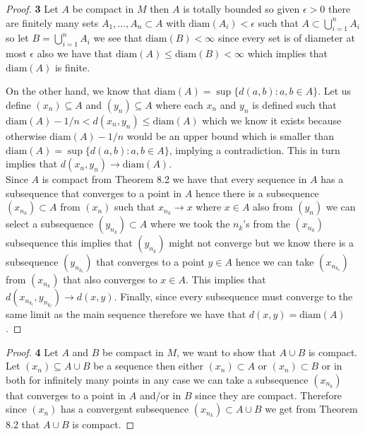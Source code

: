 \documentclass[11pt]{article}
\newcommand{\diam}{\text{diam}}
\theoremstyle{definition}
\begin{document}
\cleardoublepage
    \begin{proof}{\textbf{3}}
        Let $A$ be compact in $M$ then $A$ is totally bounded so given
        $\epsilon > 0$ there are finitely many sets $A_1,...,A_n \subset A$
        with $\diam(A_i) < \epsilon$ such that $A \subset \bigcup_{i=1}^{n} A_i$
        so let $B = \bigcup_{i=1}^{n} A_i$ we see
        that $\diam(B) < \infty$ since every set is of diameter at most
        $\epsilon$ also we have that $\diam(A) \leq \diam(B) < \infty$ which
        implies that $\diam(A)$ is finite.
        
        On the other hand, we know that $\diam(A) = \sup\{d(a,b): a,b \in A\}$.
        Let us define $(x_n) \subseteq A$ and $(y_n) \subseteq A$ where each
        $x_n$ and $y_n$ is defined such that 
        $\diam(A) - 1/n < d(x_n, y_n) \leq \diam(A)$ which we know it exists
        because otherwise $\diam(A) - 1/n$ would be an upper bound which is
        smaller than $\diam(A) = \sup\{d(a,b): a,b \in A\}$, implying a
        contradiction. This in turn implies that $d(x_n, y_n) \to \diam(A)$.\\
        Since $A$ is compact from Theorem 8.2 we have that every sequence in
        $A$ has a subsequence that converges to a point in $A$ hence there 
        is a subsequence $(x_{n_k}) \subset A$  from $(x_n)$ such that
        $x_{n_k} \to x$ where $x \in A$ also from $(y_n)$ we can select a
        subsequence $(y_{n_k}) \subset A$ where we took the $n_k$'s from the
        $(x_{n_k})$ subsequence this implies that $(y_{n_k})$ might not
        converge but we know there is a subsequence $(y_{n_{k_t}})$ that
        converges to a point $y \in A$ hence we can take $(x_{n_{k_t}})$
        from $(x_{n_k})$ that also converges to $x \in A$. This implies that 
        $d(x_{n_{k_t}}, y_{n_{k_t}}) \to d(x,y)$. Finally, since every
        subsequence must converge to the same limit as the main sequence
        therefore we have that $d(x,y) = \diam(A)$.
    \end{proof}
    \begin{proof}{\textbf{4}}
        Let $A$ and $B$ be compact in $M$, we want to show that $A \cup B$ is
        compact.
        Let $(x_n) \subseteq A\cup B$ be a sequence
        then either $(x_n) \subset A$ or $(x_n) \subset B$ or in both for
        infinitely many points in any case we can take a subsequence
        $(x_{n_k})$ that converges to a point in $A$ and/or in $B$ since they
        are compact. Therefore since $(x_n)$ has a convergent subsequence
        $(x_{n_k}) \subset A \cup B$ we get from Theorem 8.2 that $A \cup B$
        is compact.
    \end{proof}
\end{document}

